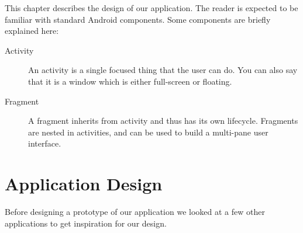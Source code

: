 This chapter describes the design of our application. The reader is expected to be familiar with standard Android components. Some components are briefly explained here:
\begin{description}
\item[Activity] An activity is a single focused thing that the user can do. You can also say that it is a window which is either full-screen or floating. \citep{activity}
\item[Fragment] A fragment inherits from activity and thus has its own lifecycle. Fragments are nested in activities, and can be used to build a multi-pane user interface. \citep{fragment}
\end{description}

\section{Application Design}\label{sec:appdesign}

Before designing a prototype of our application we looked at a few other applications to get inspiration for our design.

